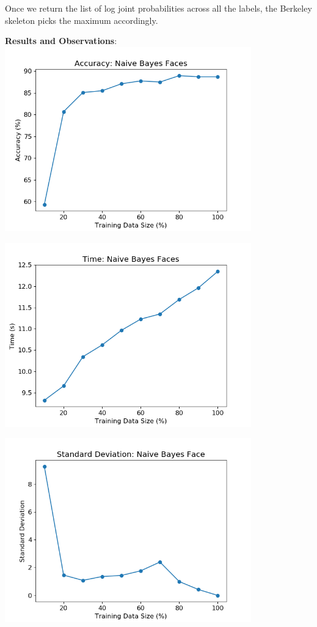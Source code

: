 \documentclass{article}
\begin{document}
Once we return the list of log joint probabilities across all the labels, the Berkeley skeleton picks the maximum accordingly.

\textbf{Results and Observations}:\\

\includegraphics[width=0.8\textwidth,height=0.8\textheight,keepaspectratio]{n_f.png}

\includegraphics[width=0.8\textwidth,height=0.8\textheight,keepaspectratio]{n_f-t.png}

\includegraphics[width=0.8\textwidth,height=0.8\textheight,keepaspectratio]{std_nf.png}
\end{document}
